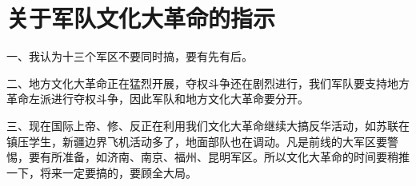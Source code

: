 \section[关于军队文化大革命的指示（一九六七年一月二十七日）]{关于军队文化大革命的指示}


一、我认为十三个军区不要同时搞，要有先有后。

二、地方文化大革命正在猛烈开展，夺权斗争还在剧烈进行，我们军队要支持地方革命左派进行夺权斗争，因此军队和地方文化大革命要分开。

三、现在国际上帝、修、反正在利用我们文化大革命继续大搞反华活动，如苏联在镇压学生，新疆边界飞机活动多了，地面部队也在调动。凡是前线的大军区要警惕，要有所准备，如济南、南京、福州、昆明军区。所以文化大革命的时间要稍推一下，将来一定要搞的，要顾全大局。


